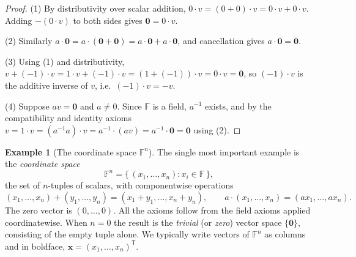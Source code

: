 \documentclass[11pt,a4paper]{article}
\theoremstyle{definition}
\newtheorem{example}[theorem]{Example}
\theoremstyle{remark}
\newcommand{\F}{\ensuremath{\mathbb{F}}}
\begin{document}
\begin{proof}
(1) By distributivity over scalar addition, \(0 \cdot v = (0 + 0) \cdot v = 0 \cdot v + 0 \cdot v\). Adding \(-(0 \cdot v)\) to both sides gives \(\mathbf{0} = 0 \cdot v\).

(2) Similarly \(a \cdot \mathbf{0} = a \cdot (\mathbf{0} + \mathbf{0}) = a \cdot \mathbf{0} + a \cdot \mathbf{0}\), and cancellation gives \(a \cdot \mathbf{0} = \mathbf{0}\).

(3) Using (1) and distributivity, \(v + (-1)\cdot v = 1\cdot v + (-1)\cdot v = (1 + (-1))\cdot v = 0 \cdot v = \mathbf{0}\), so \((-1)\cdot v\) is the additive inverse of \(v\), i.e.\ \((-1)\cdot v = -v\).

(4) Suppose \(av = \mathbf{0}\) and \(a \neq 0\). Since \(\F\) is a field, \(a^{-1}\) exists, and by the compatibility and identity axioms \(v = 1\cdot v = (a^{-1}a)\cdot v = a^{-1}\cdot(a v) = a^{-1}\cdot \mathbf{0} = \mathbf{0}\) using (2).
\end{proof}

\begin{example}[The coordinate space \(\F^n\)]\label{linalg:exa-Fn}
The single most important example is the \emph{coordinate space}
\[
\F^n = \{\, (x_1, \dots, x_n) : x_i \in \F \,\},
\]
the set of \(n\)-tuples of scalars, with componentwise operations
\[
(x_1, \dots, x_n) + (y_1, \dots, y_n) = (x_1 + y_1, \dots, x_n + y_n), \qquad
a \cdot (x_1, \dots, x_n) = (a x_1, \dots, a x_n).
\]
The zero vector is \((0, \dots, 0)\). All the axioms follow from the field axioms applied coordinatewise. When \(n = 0\) the result is the \emph{trivial} (or \emph{zero}) vector space \(\{\mathbf{0}\}\), consisting of the empty tuple alone. We typically write vectors of \(\F^n\) as columns and in boldface, \(\mathbf{x} = (x_1, \dots, x_n)^{\mathsf T}\).
\end{example}
\end{document}
